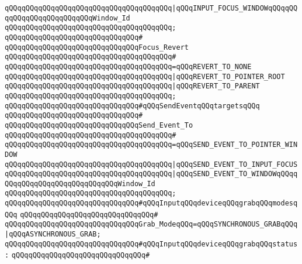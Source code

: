 \verb|qQQqqQQqqQQqqQQqqQQqqQQqqQQqqQQqqQQqqQQq|\verb#|qQQqINPUT_FOCUS_WINDOWqQQqqQQqqQQqqQQqqQQqqQQqqQQqWindow_Id#\newline
\verb|qQQqqQQqqQQqqQQqqQQqqQQqqQQqqQQqqQQqqQQq;|\newline
\verb|qQQqqQQqqQQqqQQqqQQqqQQqqQQqqQQq#|\newline
\verb|qQQqqQQqqQQqqQQqqQQqqQQqqQQqqQQqFocus_Revert|\newline
\verb|qQQqqQQqqQQqqQQqqQQqqQQqqQQqqQQqqQQqqQQq#|\newline
\verb|qQQqqQQqqQQqqQQqqQQqqQQqqQQqqQQqqQQqqQQq=qQQqREVERT_TO_NONE|\newline
\verb|qQQqqQQqqQQqqQQqqQQqqQQqqQQqqQQqqQQqqQQq|\verb#|qQQqREVERT_TO_POINTER_ROOT#\newline
\verb|qQQqqQQqqQQqqQQqqQQqqQQqqQQqqQQqqQQqqQQq|\verb#|qQQqREVERT_TO_PARENT#\newline
\verb|qQQqqQQqqQQqqQQqqQQqqQQqqQQqqQQqqQQqqQQq;|\newline
\newline
\verb|qQQqqQQqqQQqqQQqqQQqqQQqqQQqqQQq#qQQqSendEventqQQqtargetsqQQq|\newline
\verb|qQQqqQQqqQQqqQQqqQQqqQQqqQQqqQQq#|\newline
\verb|qQQqqQQqqQQqqQQqqQQqqQQqqQQqqQQqSend_Event_To|\newline
\verb|qQQqqQQqqQQqqQQqqQQqqQQqqQQqqQQqqQQqqQQq#|\newline
\verb|qQQqqQQqqQQqqQQqqQQqqQQqqQQqqQQqqQQqqQQq=qQQqSEND_EVENT_TO_POINTER_WINDOW|\newline
\verb|qQQqqQQqqQQqqQQqqQQqqQQqqQQqqQQqqQQqqQQq|\verb#|qQQqSEND_EVENT_TO_INPUT_FOCUS#\newline
\verb|qQQqqQQqqQQqqQQqqQQqqQQqqQQqqQQqqQQqqQQq|\verb#|qQQqSEND_EVENT_TO_WINDOWqQQqqQQqqQQqqQQqqQQqqQQqqQQqqQQqWindow_Id#\newline
\verb|qQQqqQQqqQQqqQQqqQQqqQQqqQQqqQQqqQQqqQQq;|\newline
\newline
\verb|qQQqqQQqqQQqqQQqqQQqqQQqqQQqqQQq#qQQqInputqQQqdeviceqQQqgrabqQQqmodesqQQq|\newline
\verb|qQQqqQQqqQQqqQQqqQQqqQQqqQQqqQQq#|\newline
\verb|qQQqqQQqqQQqqQQqqQQqqQQqqQQqqQQqGrab_ModeqQQq=qQQqSYNCHRONOUS_GRABqQQq|\verb#|qQQqASYNCHRONOUS_GRAB;#\newline
\newline
\verb|qQQqqQQqqQQqqQQqqQQqqQQqqQQqqQQq#qQQqInputqQQqdeviceqQQqgrabqQQqstatus:|\newline
\verb|qQQqqQQqqQQqqQQqqQQqqQQqqQQqqQQq#|\newline

